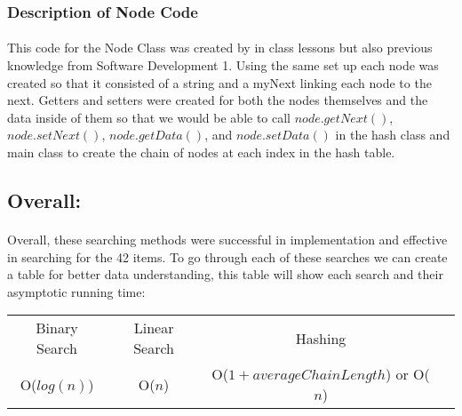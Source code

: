 \documentclass[letterpaper, 10pt,DIV=13]{scrartcl}
\numberwithin{equation}{section} %
\numberwithin{figure}{section} %
\numberwithin{table}{section} %
\begin{document}
\subsubsection{Description of Node Code}
\paragraph{} This code for the Node Class was created by in class lessons but also previous knowledge from Software Development 1. Using the same set up each node was created so that it consisted of a string and a myNext linking each node to the next. Getters and setters were created for both the nodes themselves and the data inside of them so that we would be able to call $node.getNext()$, $node.setNext()$, $node.getData()$, and $node.setData()$ in the hash class and main class to create the chain of nodes at each index in the hash table. 
\subsection{Overall:}

\paragraph{} Overall, these searching methods were successful in implementation and effective in searching for the 42 items. To go through each of these searches we can create a table for better data understanding, this table will show each search and their asymptotic running time:

\begin{center}
\begin{tabular}{ |c|c|c|c| } 
 \hline
 Binary Search & Linear Search & Hashing\\ 
 O($log(n)$) & O($n$) & O($1 + average Chain Length$) or O($n$)\\ 
 \hline
\end{tabular}
\end{center}
\end{document}
